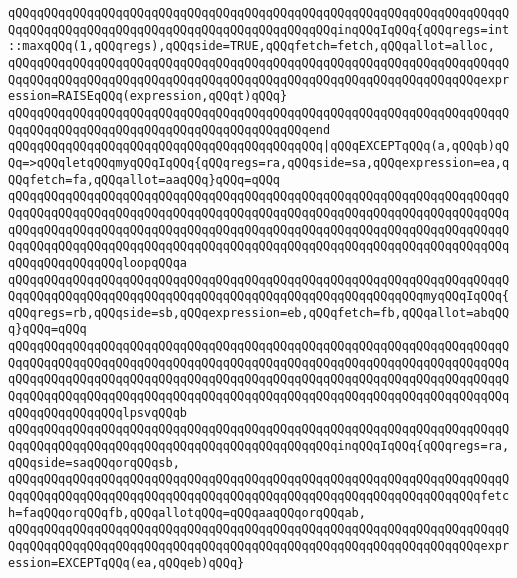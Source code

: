 \verb|qQQqqQQqqQQqqQQqqQQqqQQqqQQqqQQqqQQqqQQqqQQqqQQqqQQqqQQqqQQqqQQqqQQqqQQqqQQqqQQqqQQqqQQqqQQqqQQqqQQqqQQqqQQqqQQqqQQqinqQQqIqQQq{qQQqregs=int::maxqQQq(1,qQQqregs),qQQqside=TRUE,qQQqfetch=fetch,qQQqallot=alloc,|\newline
\verb|qQQqqQQqqQQqqQQqqQQqqQQqqQQqqQQqqQQqqQQqqQQqqQQqqQQqqQQqqQQqqQQqqQQqqQQqqQQqqQQqqQQqqQQqqQQqqQQqqQQqqQQqqQQqqQQqqQQqqQQqqQQqqQQqqQQqqQQqexpression=RAISEqQQq(expression,qQQqt)qQQq}|\newline
\verb|qQQqqQQqqQQqqQQqqQQqqQQqqQQqqQQqqQQqqQQqqQQqqQQqqQQqqQQqqQQqqQQqqQQqqQQqqQQqqQQqqQQqqQQqqQQqqQQqqQQqqQQqqQQqqQQqend|\newline
\verb|qQQqqQQqqQQqqQQqqQQqqQQqqQQqqQQqqQQqqQQqqQQq|\verb#|qQQqEXCEPTqQQq(a,qQQqb)qQQq=>qQQqletqQQqmyqQQqIqQQq{qQQqregs=ra,qQQqside=sa,qQQqexpression=ea,qQQqfetch=fa,qQQqallot=aaqQQq}qQQq=qQQq#\newline
\verb|qQQqqQQqqQQqqQQqqQQqqQQqqQQqqQQqqQQqqQQqqQQqqQQqqQQqqQQqqQQqqQQqqQQqqQQqqQQqqQQqqQQqqQQqqQQqqQQqqQQqqQQqqQQqqQQqqQQqqQQqqQQqqQQqqQQqqQQqqQQqqQQqqQQqqQQqqQQqqQQqqQQqqQQqqQQqqQQqqQQqqQQqqQQqqQQqqQQqqQQqqQQqqQQqqQQqqQQqqQQqqQQqqQQqqQQqqQQqqQQqqQQqqQQqqQQqqQQqqQQqqQQqqQQqqQQqqQQqqQQqqQQqqQQqqQQqqQQqloopqQQqa|\newline
\verb|qQQqqQQqqQQqqQQqqQQqqQQqqQQqqQQqqQQqqQQqqQQqqQQqqQQqqQQqqQQqqQQqqQQqqQQqqQQqqQQqqQQqqQQqqQQqqQQqqQQqqQQqqQQqqQQqqQQqqQQqqQQqqQQqmyqQQqIqQQq{qQQqregs=rb,qQQqside=sb,qQQqexpression=eb,qQQqfetch=fb,qQQqallot=abqQQq}qQQq=qQQq|\newline
\verb|qQQqqQQqqQQqqQQqqQQqqQQqqQQqqQQqqQQqqQQqqQQqqQQqqQQqqQQqqQQqqQQqqQQqqQQqqQQqqQQqqQQqqQQqqQQqqQQqqQQqqQQqqQQqqQQqqQQqqQQqqQQqqQQqqQQqqQQqqQQqqQQqqQQqqQQqqQQqqQQqqQQqqQQqqQQqqQQqqQQqqQQqqQQqqQQqqQQqqQQqqQQqqQQqqQQqqQQqqQQqqQQqqQQqqQQqqQQqqQQqqQQqqQQqqQQqqQQqqQQqqQQqqQQqqQQqqQQqqQQqqQQqqQQqqQQqqQQqlpsvqQQqb|\newline
\verb|qQQqqQQqqQQqqQQqqQQqqQQqqQQqqQQqqQQqqQQqqQQqqQQqqQQqqQQqqQQqqQQqqQQqqQQqqQQqqQQqqQQqqQQqqQQqqQQqqQQqqQQqqQQqqQQqqQQqinqQQqIqQQq{qQQqregs=ra,qQQqside=saqQQqorqQQqsb,|\newline
\verb|qQQqqQQqqQQqqQQqqQQqqQQqqQQqqQQqqQQqqQQqqQQqqQQqqQQqqQQqqQQqqQQqqQQqqQQqqQQqqQQqqQQqqQQqqQQqqQQqqQQqqQQqqQQqqQQqqQQqqQQqqQQqqQQqqQQqqQQqfetch=faqQQqorqQQqfb,qQQqallotqQQq=qQQqaaqQQqorqQQqab,|\newline
\verb|qQQqqQQqqQQqqQQqqQQqqQQqqQQqqQQqqQQqqQQqqQQqqQQqqQQqqQQqqQQqqQQqqQQqqQQqqQQqqQQqqQQqqQQqqQQqqQQqqQQqqQQqqQQqqQQqqQQqqQQqqQQqqQQqqQQqqQQqexpression=EXCEPTqQQq(ea,qQQqeb)qQQq}|\newline
